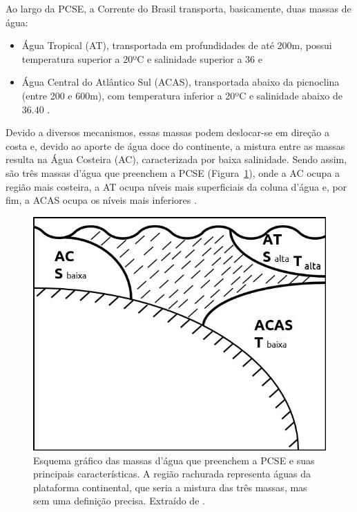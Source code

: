 
\hspace{5mm} Ao largo da PCSE, a Corrente do Brasil transporta, basicamente, duas massas de água:

\begin{itemize}
    \item Água Tropical (AT), transportada em profundidades de até 200m, possui temperatura superior a 20ºC e salinidade superior a 36 \citep{miranda1982analise} e
\item Água Central do Atlântico Sul (ACAS), transportada abaixo da picnoclina (entre 200 e 600m), com temperatura inferior a 20ºC e salinidade abaixo de 36.40 \citep{miranda1982analise}.
\end{itemize}

\hspace{5mm} Devido a diversos mecanismos, essas massas podem deslocar-se em direção a costa e, devido ao aporte de água doce do continente, a mistura entre as massas resulta na Água Costeira (AC), caracterizada por baixa salinidade. Sendo assim, são três massas d'água que preenchem a PCSE (Figura~\ref{fig:massas_dagua}), onde a AC ocupa a região mais costeira, a AT ocupa níveis mais superficiais da coluna d'água e, por fim, a ACAS ocupa os níveis mais inferiores \citep{emilsson1961shelf,de1979aplicaccao,miranda1982analise,castro1998physical}.

\begin{figure}[!h]
    \centering
    \includegraphics[width=0.5\linewidth]{figuras/massasPCSE.png}
\caption[Massas d'água que preenchem a PCSE]{Esquema gráfico das massas d'água que preenchem a PCSE e suas principais características. A região rachurada representa águas da plataforma continental, que seria a mistura das três massas, mas sem uma definição precisa. Extraído de \cite{castro2015191}.}
    \label{fig:massas_dagua}
\end{figure}

